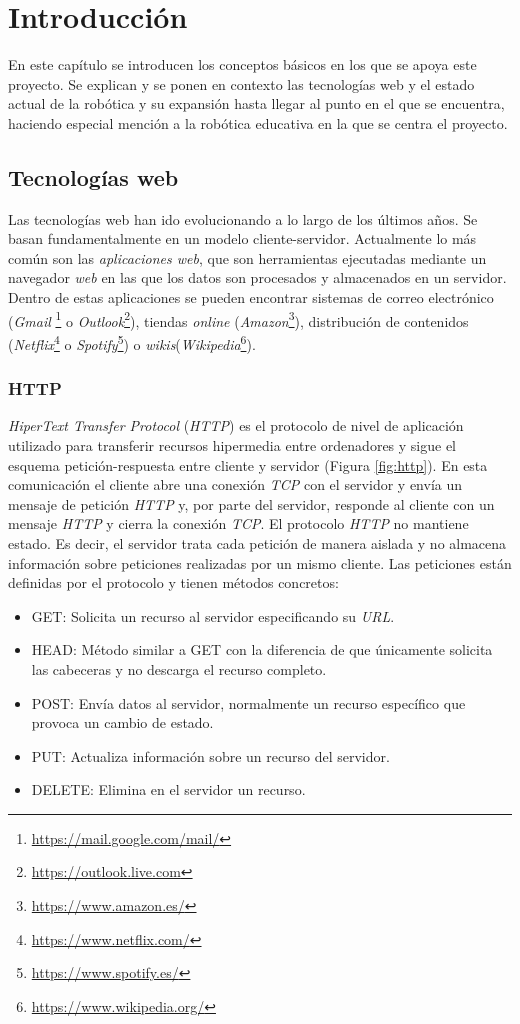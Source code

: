 
\chapter{Introducción}
\label{chap:intro} 
En este capítulo se introducen los conceptos básicos en los que se apoya este proyecto. Se explican y se ponen en contexto las tecnologías web y el estado actual de la robótica y su expansión hasta llegar al punto en el que se encuentra, haciendo especial mención a la robótica educativa en la que se centra el proyecto.
   
\section{Tecnologías web}
\label{sec:web}
Las tecnologías web han ido evolucionando a lo largo de los últimos años. Se basan fundamentalmente en un modelo cliente-servidor. Actualmente lo más común son las \textit{aplicaciones web}, que son herramientas ejecutadas mediante un navegador \textit{web} en las que los datos son procesados y almacenados en un servidor. Dentro de estas aplicaciones se pueden encontrar sistemas de correo electrónico (\textit{Gmail} \footnote{\url{https://mail.google.com/mail/}} o \textit{Outlook}\footnote{\url{https://outlook.live.com}}), tiendas \textit{online} (\textit{Amazon}\footnote{\url{https://www.amazon.es/}}), distribución de contenidos (\textit{Netflix}\footnote{ \url{https://www.netflix.com/}} o \textit{Spotify}\footnote{ \url{https://www.spotify.es/}}) o \textit{wikis}(\textit{Wikipedia}\footnote{\url{https://www.wikipedia.org/}}).

\subsection{HTTP}
\label{subsec:http}
\textit{HiperText Transfer Protocol} (\textit{HTTP}) es el protocolo de nivel de aplicación utilizado para transferir recursos hipermedia entre ordenadores y sigue el esquema petición-respuesta entre cliente y servidor (Figura \ref{fig:http}). En esta comunicación el cliente abre una conexión \textit{TCP} con el servidor y envía un mensaje de petición \textit{HTTP} y, por parte del servidor, responde al cliente con un mensaje \textit{HTTP} y cierra la conexión \textit{TCP}. 
El protocolo \textit{HTTP} no mantiene estado. Es decir, el servidor trata cada petición de manera aislada y no almacena información sobre peticiones realizadas por un mismo cliente. 
Las peticiones están definidas por el protocolo y tienen métodos concretos: 
\begin{itemize}
    \item GET: Solicita un recurso al servidor especificando su \textit{URL}.
    \item HEAD: Método similar a GET con la diferencia de que únicamente solicita las cabeceras y no descarga el recurso completo.
    \item POST: Envía datos al servidor, normalmente un recurso específico que provoca un cambio de estado. 
    \item PUT: Actualiza información sobre un recurso del servidor. 
    \item DELETE: Elimina en el servidor un recurso.
\end{itemize}

